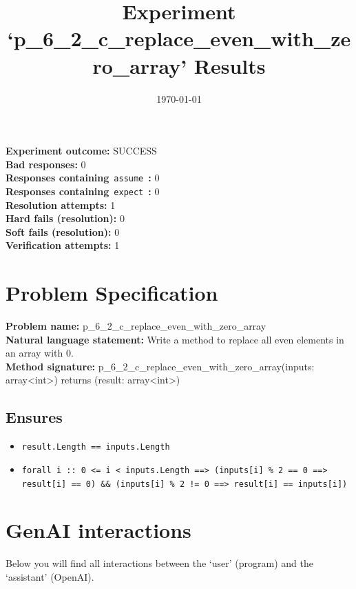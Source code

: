 \documentclass{article}
\begin{document}
\title{Experiment `p\_6\_2\_c\_replace\_even\_with\_zero\_array' Results}
\author{\today}
\date{}
\maketitle
\textbf{Experiment outcome: }SUCCESS
\\\textbf{Bad responses: }0
\\\textbf{Responses containing}~\texttt{assume}~\textbf{: }0
\\\textbf{Responses containing}~\texttt{expect}~\textbf{: }0
\\\textbf{Resolution attempts: }1
\\\textbf{Hard fails (resolution): }0
\\\textbf{Soft fails (resolution): }0
\\\textbf{Verification attempts: }1
\section*{Problem Specification}
\textbf{Problem name: }p\_6\_2\_c\_replace\_even\_with\_zero\_array
\\\textbf{Natural language statement: }Write a method to replace all even elements in an array with 0.
\\\textbf{Method signature: }p\_6\_2\_c\_replace\_even\_with\_zero\_array(inputs: array<int>) returns (result: array<int>)
\subsection*{Ensures}
\begin{itemize}
\item \texttt{result.Length == inputs.Length}
\item \texttt{forall i :: 0 <= i < inputs.Length ==> (inputs[i] \% 2 == 0 ==> result[i] == 0) \&\& (inputs[i] \% 2 != 0 ==> result[i] == inputs[i])}
\end{itemize}
\clearpage
\section*{GenAI interactions}
Below you will find all interactions between the `user' (program) and the `assistant' (OpenAI).
\end{document}
